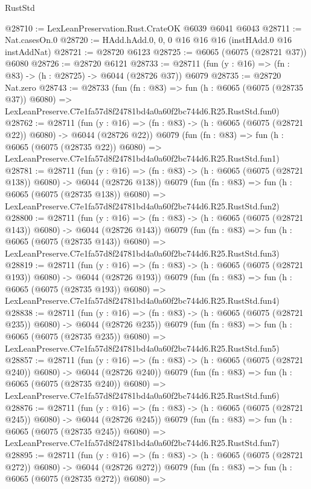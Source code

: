 \begin{lexlean}{RustStd}
\begin{coremodule}
@28710 := LexLeanPreservation.Rust.CrateOK @6039 @6041 @6043
@28711 := Nat.casesOn.{0}
@28720 := HAdd.hAdd.{0, 0, 0} @16 @16 @16 (instHAdd.{0} @16 instAddNat)
@28721 := @28720 @6123
@28725 := @6065 (@6075 (@28721 @37)) @6080
@28726 := @28720 @6121
@28733 := @28711 (fun (y : @16) => (fn : @83) -> (h : @28725) -> @6044 (@28726 @37)) @6079
@28735 := @28720 Nat.zero
@28743 := @28733
    (fun (fn : @83) =>
    fun (h : @6065 (@6075 (@28735 @37)) @6080) =>
    LexLeanPreserve.C7e1fa57d8f24781bd4a0a60f2bc744d6.R25.RustStd.fun0)
@28762 := @28711
    (fun (y : @16) => (fn : @83) -> (h : @6065 (@6075 (@28721 @22)) @6080) -> @6044 (@28726 @22))
    @6079
    (fun (fn : @83) =>
    fun (h : @6065 (@6075 (@28735 @22)) @6080) =>
    LexLeanPreserve.C7e1fa57d8f24781bd4a0a60f2bc744d6.R25.RustStd.fun1)
@28781 := @28711
    (fun (y : @16) => (fn : @83) -> (h : @6065 (@6075 (@28721 @138)) @6080) -> @6044 (@28726 @138))
    @6079
    (fun (fn : @83) =>
    fun (h : @6065 (@6075 (@28735 @138)) @6080) =>
    LexLeanPreserve.C7e1fa57d8f24781bd4a0a60f2bc744d6.R25.RustStd.fun2)
@28800 := @28711
    (fun (y : @16) => (fn : @83) -> (h : @6065 (@6075 (@28721 @143)) @6080) -> @6044 (@28726 @143))
    @6079
    (fun (fn : @83) =>
    fun (h : @6065 (@6075 (@28735 @143)) @6080) =>
    LexLeanPreserve.C7e1fa57d8f24781bd4a0a60f2bc744d6.R25.RustStd.fun3)
@28819 := @28711
    (fun (y : @16) => (fn : @83) -> (h : @6065 (@6075 (@28721 @193)) @6080) -> @6044 (@28726 @193))
    @6079
    (fun (fn : @83) =>
    fun (h : @6065 (@6075 (@28735 @193)) @6080) =>
    LexLeanPreserve.C7e1fa57d8f24781bd4a0a60f2bc744d6.R25.RustStd.fun4)
@28838 := @28711
    (fun (y : @16) => (fn : @83) -> (h : @6065 (@6075 (@28721 @235)) @6080) -> @6044 (@28726 @235))
    @6079
    (fun (fn : @83) =>
    fun (h : @6065 (@6075 (@28735 @235)) @6080) =>
    LexLeanPreserve.C7e1fa57d8f24781bd4a0a60f2bc744d6.R25.RustStd.fun5)
@28857 := @28711
    (fun (y : @16) => (fn : @83) -> (h : @6065 (@6075 (@28721 @240)) @6080) -> @6044 (@28726 @240))
    @6079
    (fun (fn : @83) =>
    fun (h : @6065 (@6075 (@28735 @240)) @6080) =>
    LexLeanPreserve.C7e1fa57d8f24781bd4a0a60f2bc744d6.R25.RustStd.fun6)
@28876 := @28711
    (fun (y : @16) => (fn : @83) -> (h : @6065 (@6075 (@28721 @245)) @6080) -> @6044 (@28726 @245))
    @6079
    (fun (fn : @83) =>
    fun (h : @6065 (@6075 (@28735 @245)) @6080) =>
    LexLeanPreserve.C7e1fa57d8f24781bd4a0a60f2bc744d6.R25.RustStd.fun7)
@28895 := @28711
    (fun (y : @16) => (fn : @83) -> (h : @6065 (@6075 (@28721 @272)) @6080) -> @6044 (@28726 @272))
    @6079
    (fun (fn : @83) =>
    fun (h : @6065 (@6075 (@28735 @272)) @6080) =>

\end{coremodule}
\end{lexlean}
